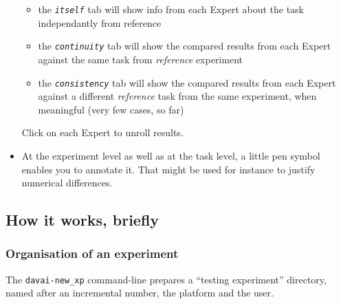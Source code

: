 \documentclass[a4paper,10pt,twoside]{article}
\begin{document}
\begin{itemize}
 \begin{itemize}
  \item the \textit{\texttt{itself}} tab will show info from each Expert about the task independantly from reference
  \item the \textit{\texttt{continuity}} tab will show the compared results from each Expert against the same task from \textit{reference} experiment
  \item the \textit{\texttt{consistency}} tab will show the compared results from each Expert against a different \textit{reference} task from the same experiment, when meaningful (very few cases, so far)
 \end{itemize}
 Click on each Expert to unroll results.
 \item At the experiment level as well as at the task level, a little pen symbol enables you to annotate it. That might be used for instance to justify numerical differences.
\end{itemize}





\newpage
\subsection{How it works, briefly}
\subsubsection{Organisation of an experiment}
The \texttt{davai-new\_xp} command-line prepares a ``testing experiment'' directory, named after an incremental number, the platform and the user.
\end{document}
